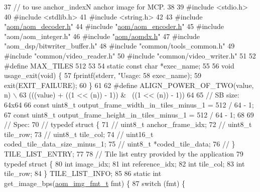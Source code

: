 \begin{DoxyCodeInclude}
37 \textcolor{comment}{// to use anchor\_indexN anchor image for MCP.}
38 
39 \textcolor{preprocessor}{#include <stdio.h>}
40 \textcolor{preprocessor}{#include <stdlib.h>}
41 \textcolor{preprocessor}{#include <string.h>}
42 
43 \textcolor{preprocessor}{#include "\hyperlink{aom__decoder_8h}{aom/aom\_decoder.h}"}
44 \textcolor{preprocessor}{#include "\hyperlink{aom__encoder_8h}{aom/aom\_encoder.h}"}
45 \textcolor{preprocessor}{#include "aom/aom\_integer.h"}
46 \textcolor{preprocessor}{#include "\hyperlink{aomdx_8h}{aom/aomdx.h}"}
47 \textcolor{preprocessor}{#include "aom\_dsp/bitwriter\_buffer.h"}
48 \textcolor{preprocessor}{#include "common/tools\_common.h"}
49 \textcolor{preprocessor}{#include "common/video\_reader.h"}
50 \textcolor{preprocessor}{#include "common/video\_writer.h"}
51 
52 \textcolor{preprocessor}{#define MAX\_TILES 512}
53 
54 \textcolor{keyword}{static} \textcolor{keyword}{const} \textcolor{keywordtype}{char} *exec\_name;
55 
56 \textcolor{keywordtype}{void} usage\_exit(\textcolor{keywordtype}{void}) \{
57   fprintf(stderr, \textcolor{stringliteral}{"Usage: %
58           exec\_name);
59   exit(EXIT\_FAILURE);
60 \}
61 
62 \textcolor{preprocessor}{#define ALIGN\_POWER\_OF\_TWO(value, n) \(\backslash\)}
63 \textcolor{preprocessor}{  (((value) + ((1 << (n)) - 1)) & ~((1 << (n)) - 1))}
64 
65 \textcolor{comment}{// SB size: 64x64}
66 \textcolor{keyword}{const} uint8\_t output\_frame\_width\_in\_tiles\_minus\_1 = 512 / 64 - 1;
67 \textcolor{keyword}{const} uint8\_t output\_frame\_height\_in\_tiles\_minus\_1 = 512 / 64 - 1;
68 
69 \textcolor{comment}{// Spec:}
70 \textcolor{comment}{// typedef struct \{}
71 \textcolor{comment}{//   uint8\_t anchor\_frame\_idx;}
72 \textcolor{comment}{//   uint8\_t tile\_row;}
73 \textcolor{comment}{//   uint8\_t tile\_col;}
74 \textcolor{comment}{//   uint16\_t coded\_tile\_data\_size\_minus\_1;}
75 \textcolor{comment}{//   uint8\_t *coded\_tile\_data;}
76 \textcolor{comment}{// \} TILE\_LIST\_ENTRY;}
77 
78 \textcolor{comment}{// Tile list entry provided by the application}
79 \textcolor{keyword}{typedef} \textcolor{keyword}{struct }\{
80   \textcolor{keywordtype}{int} image\_idx;
81   \textcolor{keywordtype}{int} reference\_idx;
82   \textcolor{keywordtype}{int} tile\_col;
83   \textcolor{keywordtype}{int} tile\_row;
84 \} TILE\_LIST\_INFO;
85 
86 \textcolor{keyword}{static} \textcolor{keywordtype}{int} get\_image\_bps(\hyperlink{aom__image_8h_ab71efff8c7f49380fad23b93bc2e9bfc}{aom\_img\_fmt\_t} fmt) \{
87   \textcolor{keywordflow}{switch} (fmt) \{
}
\end{DoxyCodeInclude}
